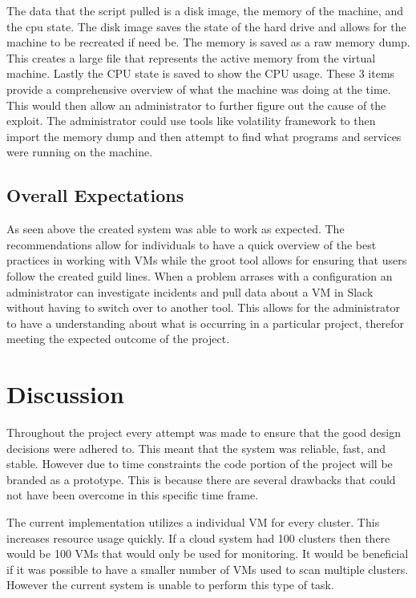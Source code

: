 \documentclass[12pt]{article}
\begin{document}
The data that the script pulled is a disk image, the memory of the machine, and the cpu state. The disk image saves the state of the hard drive and allows for the machine to be recreated if need be. The memory is saved as a raw memory dump. This creates a large file that represents the active memory from the virtual machine. Lastly the CPU state is saved to show the CPU usage. These 3 items provide a comprehensive overview of what the machine was doing at the time. This would then allow an administrator to further figure out the cause of the exploit. The administrator could use tools like volatility framework \cite{volitilityFram} to then import the memory dump and then attempt to find what programs and services were running on the machine.

\subsection{Overall Expectations}
As seen above the created system was able to work as expected. The recommendations allow for individuals to have a quick overview of the best practices in working with VMs while the groot tool allows for ensuring that users follow the created guild lines. When a problem arrases with a configuration an administrator can investigate incidents and pull data about a VM in Slack without having to switch over to another tool. This allows for the administrator to have a understanding about what is occurring in a particular project, therefor meeting the expected outcome of the project.

\section{Discussion}
Throughout the project every attempt was made to ensure that the good design decisions were adhered to. This meant that the system was reliable, fast, and stable. However due to time constraints the code portion of the project will be branded as a prototype. This is because there are several drawbacks that could not have been overcome in this specific time frame.

The current implementation utilizes a individual VM for every cluster. This increases resource usage quickly. If a cloud system had 100 clusters then there would be 100 VMs that would only be used for monitoring. It would be beneficial if it was possible to have a smaller number of VMs used to scan multiple clusters. However the current system is unable to perform this type of task.
\end{document}
